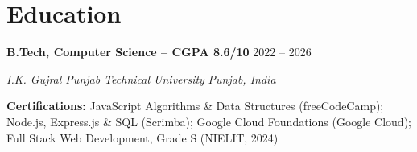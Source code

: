 \documentclass[letterpaper,10.5pt]{article}
\newcommand{\Entry}[4]{%
  \textbf{#1} \hfill {\small #2}\par
  \textit{\small #3} \hfill {\small\textit{#4}}\par\vspace{-1pt}}
\newcommand{\SkillRow}[2]{{\small \textbf{#1:} #2}\par\vspace{1.5pt}}
\begin{document}
\section{Education}
\Entry{B.Tech, Computer Science -- CGPA 8.6/10}{2022 -- 2026}{I.K. Gujral Punjab Technical University}{Punjab, India}
\vspace{2pt}
\SkillRow{Certifications}{JavaScript Algorithms \& Data Structures (freeCodeCamp); Node.js, Express.js \& SQL (Scrimba); Google Cloud Foundations (Google Cloud); Full Stack Web Development, Grade S (NIELIT, 2024)}
\end{document}
